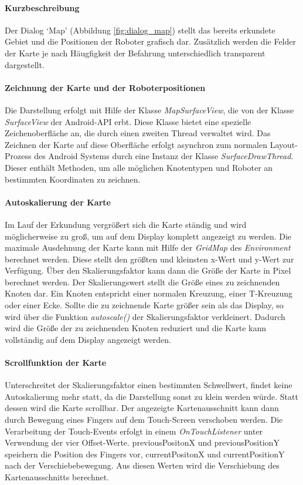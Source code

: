 \documentclass[10pt,a4paper]{article}
\begin{document}
	\paragraph*{Kurzbeschreibung} Der Dialog `Map' (Abbildung \ref{fig:dialog_map}) stellt das bereits erkundete Gebiet und die Positionen der Roboter
	grafisch dar. Zusätzlich werden die Felder der Karte je nach Häugfigkeit der Befahrung unterschiedlich transparent dargestellt.
	
	\paragraph*{Zeichnung der Karte und der Roboterpositionen}
	Die Darstellung erfolgt mit Hilfe der Klasse \textit{MapSurfaceView}, die von der Klasse \textit{SurfaceView} der Android-API erbt. Diese Klasse
	bietet eine spezielle Zeichenoberfläche an, die durch einen zweiten Thread verwaltet wird. Das Zeichnen der Karte auf diese Oberfläche erfolgt
	asynchron zum normalen Layout-Prozess des Android Systems durch eine Instanz der Klasse \textit{SurfaceDrawThread}.
	Dieser enthält Methoden, um alle möglichen Knotentypen und Roboter an bestimmten Koordinaten zu zeichnen.
	
	\paragraph*{Autoskalierung der Karte}
	Im Lauf der Erkundung vergrößert sich die Karte ständig und wird möglicherweise zu groß, um auf dem Display komplett angezeigt zu werden.
    Die maximale Ausdehnung der Karte kann mit Hilfe der \textit{GridMap} des \textit{Environment} berechnet werden. Diese stellt den größten und
    kleinsten x-Wert und y-Wert zur Verfügung. Über den Skalierungsfaktor kann dann die Größe der Karte in Pixel berechnet werden. Der
    Skalierungswert stellt die Größe eines zu zeichnenden Knoten dar. Ein Knoten entspricht einer normalen Kreuzung, einer T-Kreuzung oder
    einer Ecke.
	Sollte die zu zeichnende Karte größer sein als das Display, so wird über die Funktion \textit{autoscale()} der Skalierungsfaktor verkleinert.
	Dadurch wird die Größe der zu zeichnenden Knoten reduziert und die Karte kann vollständig auf dem Display angezeigt werden. 
	
	\paragraph*{Scrollfunktion der Karte}
	Unterschreitet der Skalierungsfaktor einen bestimmten Schwellwert, findet keine Autoskalierung mehr statt, da die Darstellung sonst zu klein
	werden würde. Statt dessen wird die Karte scrollbar. Der angezeigte Kartenausschnitt kann dann durch Bewegung eines Fingers auf dem Touch-Screen
	verschoben werden.
	Die Verarbeitung der Touch-Events erfolgt in einem \textit{OnTouchListener} unter Verwendung der vier Offset-Werte. previousPositonX und
	previousPositionY speichern die Position des Fingers vor, currentPositonX und currentPositionY nach der Verschiebebewegung. Aus diesen Werten
	wird die Verschiebung des Kartenausschnitts berechnet.
	
\end{document}
